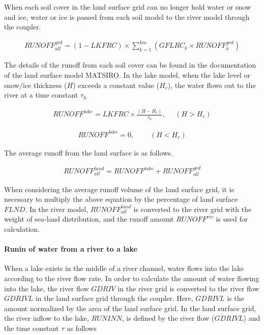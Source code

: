When each soil cover in the land surface grid can no longer hold water
or snow and ice, water or ice is passed from each soil model to the
river model through the coupler.

\begin{eqnarray} RUNOFF^{grd}_{all} =
    (1-LKFRC) \times \sum_{k=1}^{km}(GFLRC_{k} \times RUNOFF^{grd}_{k}) \end{eqnarray}

The details of the runoff from each soil cover can be found in the
documentation of the land surface model MATSIRO. In the lake model, when
the lake level or snow/ice thickness (\(H\)) exceeds a constant value
(\(H_c\)), the water flows out to the river at a time constant
\(\tau_h\)

\begin{eqnarray} RUNOFF^{lake} = LKFRC \times \frac{(H-H_c)}{\tau_h},~~~~~~ (H>H_c) \end{eqnarray}

\begin{eqnarray} RUNOFF^{lake} = 0,~~~~~~~~~~ (H<H_c) \end{eqnarray}

The average runoff from the land surface is as follows.

\begin{eqnarray} RUNOFF^{land}_{all} = RUNOFF^{lake} + RUNOFF^{grd}_{all} \end{eqnarray}

When considering the average runoff volume of the land surface grid, it
is necessary to multiply the above equation by the percentage of land
surface \(FLND\). In the river model, \(RUNOFF^{land}_{all}\) is
converted to the river grid with the weight of sea-land distribution,
and the runoff amount \(RUNOFF^{riv}\) is used for calculation.

\hypertarget{runin-of-water-from-a-river-to-a-lake}{%
\paragraph{Runin of water from a river to a
lake}\label{runin-of-water-from-a-river-to-a-lake}}

When a lake exists in the middle of a river channel, water flows into
the lake according to the river flow rate. In order to calculate the
amount of water flowing into the lake, the river flow \(GDRIV\) in the
river grid is converted to the river flow \(GDRIVL\) in the land surface
grid through the coupler. Here, \(GDRIVL\) is the amount normalized by
the area of the land surface grid. In the land surface grid, the river
inflow to the lake, \(RUNINN\), is defined by the river flow
(\(GDRIVL\)) and the time constant \(\tau\) as follows

